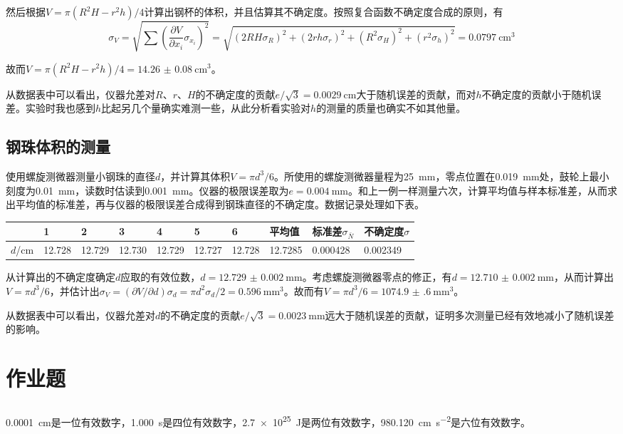 \documentclass[UTF8]{ctexart}
\begin{document}
然后根据$V=\pi(R^2H-r^2h)/4$计算出钢杯的体积，并且估算其不确定度。按照复合函数不确定度合成的原则，有
\begin{equation*}
  \sigma_V=\sqrt{\sum(\frac{\partial V}{\partial x_i}\sigma_{x_i})^2}=\sqrt{(2RH\sigma_R)^2+(2rh\sigma_r)^2+(R^2\sigma_H)^2+(r^2\sigma_h)^2}=\SI{0.0797}{\cm^3}
\end{equation*}

故而$V=\pi(R^2H-r^2h)/4=\SI{14.26(8)}{\cm^3}$。

从数据表中可以看出，仪器允差对$R$、$r$、$H$的不确定度的贡献$e/\sqrt{3}=\SI{0.0029}{\cm}$大于随机误差的贡献，而对$h$不确定度的贡献小于随机误差。实验时我也感到$h$比起另几个量确实难测一些，从此分析看实验对$h$的测量的质量也确实不如其他量。

\subsection{钢珠体积的测量}
使用螺旋测微器测量小钢珠的直径$d$，并计算其体积$V=\pi d^3/6$。所使用的螺旋测微器量程为\SI{25}{\mm}，零点位置在\SI{0.019}{\mm}处，鼓轮上最小刻度为\SI{0.01}{\mm}，读数时估读到\SI{0.001}{\mm}。仪器的极限误差取为$e=\SI{0.004}{\mm}$。和上一例一样测量六次，计算平均值与样本标准差，从而求出平均值的标准差，再与仪器的极限误差合成得到钢珠直径的不确定度。数据记录处理如下表。

\noindent
\begin{tabu} to \linewidth {X|X X X X X X|X X[1.8]|X[1.8]}
\hline
& 1&  2&  3&  4&  5&  6&  平均值&标准差$\sigma_{\bar{N}}$&不确定度$\sigma$ \\
\hline
$d$/cm &12.728&12.729&12.730&12.729&12.727&12.728&12.7285&0.000428&0.002349\\
\hline
\end{tabu}

从计算出的不确定度确定$d$应取的有效位数，$d=\SI{12.729(2)}{\mm}$。考虑螺旋测微器零点的修正，有$d=\SI{12.710(2)}{\mm}$，从而计算出$V=\pi d^3/6$，并估计出$\sigma_V=(\partial V/\partial d)\sigma_d=\pi d^2 \sigma_d/2=\SI{0.596}{\mm^3}$。故而有$V=\pi d^3/6=\SI{1074.9(6)}{\mm^3}$。

从数据表中可以看出，仪器允差对$d$的不确定度的贡献$e/\sqrt{3}=\SI{0.0023}{\mm}$远大于随机误差的贡献，证明多次测量已经有效地减小了随机误差的影响。

\section{作业题}
\subsection{}
\SI{0.0001}{cm}是一位有效数字，\SI{1.000}{s}是四位有效数字，\SI{2.7e25}{\joule}是两位有效数字，\SI{980.120}{cm.s^{-2}}是六位有效数字。
\end{document}
